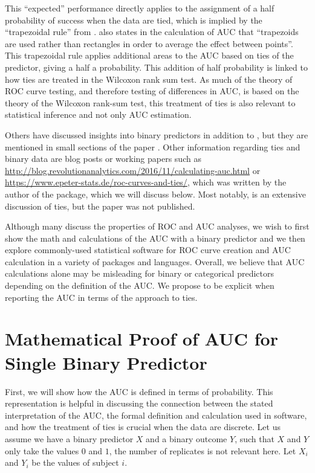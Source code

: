 \documentclass[article]{jss}
\begin{document}
This ``expected'' performance directly applies to the assignment of a
half probability of success when the data are tied, which is implied by
the ``trapezoidal rule'' from \citet{hanley1982meaning}.
\citet{fawcett2006introduction} also states in the calculation of AUC
that ``trapezoids are used rather than rectangles in order to average
the effect between points''. This trapezoidal rule applies additional
areas to the AUC based on ties of the predictor, giving a half a
probability. This addition of half probability is linked to how ties are
treated in the Wilcoxon rank sum test. As much of the theory of ROC
curve testing, and therefore testing of differences in AUC, is based on
the theory of the Wilcoxon rank-sum test, this treatment of ties is also
relevant to statistical inference and not only AUC estimation.

Others have discussed insights into binary predictors in addition to
\citet{fawcett2006introduction}, but they are mentioned in small
sections of the paper \citep{saito2015precision, pepe2009estimation}.
Other information regarding ties and binary data are blog posts or
working papers such as
\url{http://blog.revolutionanalytics.com/2016/11/calculating-auc.html}
or \url{https://www.epeter-stats.de/roc-curves-and-ties/}, which was
written by the author of the  \citep{fbroc} package, which we
will discuss below. Most notably, \citet{hsu2014inference} is an
extensive discussion of ties, but the paper was not published.

Although many discuss the properties of ROC and AUC analyses, we wish to
first show the math and calculations of the AUC with a binary predictor
and we then explore commonly-used statistical software for ROC curve
creation and AUC calculation in a variety of packages and languages.
Overall, we believe that AUC calculations alone may be misleading for
binary or categorical predictors depending on the definition of the AUC.
We propose to be explicit when reporting the AUC in terms of the
approach to ties.

\hypertarget{mathematical-proof-of-auc-for-single-binary-predictor}{%
\section{Mathematical Proof of AUC for Single Binary
Predictor}\label{mathematical-proof-of-auc-for-single-binary-predictor}}

First, we will show how the AUC is defined in terms of probability. This
representation is helpful in discussing the connection between the
stated interpretation of the AUC, the formal definition and calculation
used in software, and how the treatment of ties is crucial when the data
are discrete. Let us assume we have a binary predictor \(X\) and a
binary outcome \(Y\), such that \(X\) and \(Y\) only take the values
\(0\) and \(1\), the number of replicates is not relevant here. Let
\(X_{i}\) and \(Y_{i}\) be the values of subject \(i\).
\end{document}
